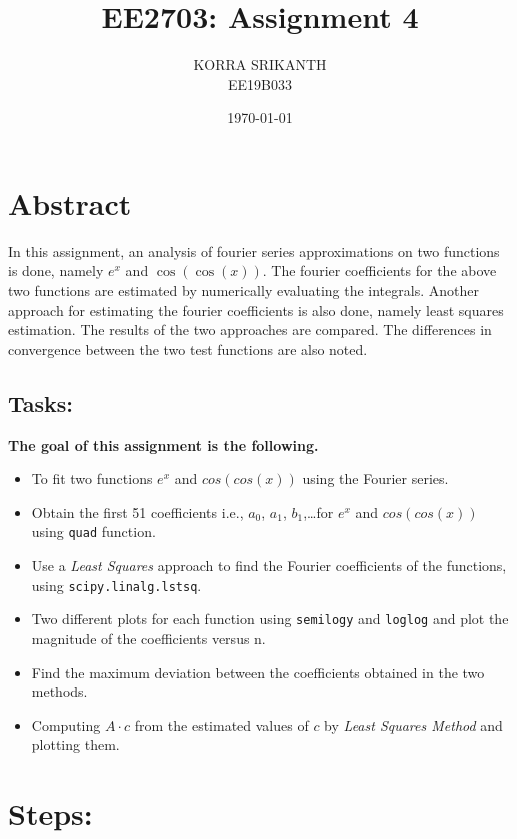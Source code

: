 \documentclass[11pt, a4paper, twoside]{article}
\title{EE2703: Assignment 4} %
\author{KORRA SRIKANTH\\{\samll EE19B033}} %
\date{\today} %
\begin{document}
	

\maketitle   %
		
\section*{Abstract}

In this assignment, an analysis of fourier series approximations on two
functions is done, namely \(e^x\) and \(\cos(\cos(x))\). 
\newline
The fourier coefficients for the above two functions are estimated by numerically evaluating the integrals.
\newline
Another approach for estimating the fourier coefficients is also done, namely least squares estimation. The results of the two approaches are compared.
\newline
The differences in convergence between the two test functions are also noted.



\subsection*{Tasks:}
\textbf{The goal of this assignment is the following.}
\begin{itemize}
\item To fit two functions $e^{x}$ and $cos(cos(x))$ using the Fourier series.
\item Obtain the first 51 coefficients i.e., $a_0$, $a_1$, $b_1$,\ldots for $e^x$ and $cos(cos(x))$ using \texttt{quad} function.
 \item Use a \textit{Least Squares} approach to find the Fourier coefficients of the functions, using \texttt{scipy.linalg.lstsq}.
  \item Two  different  plots  for  each  function  using  \texttt{semilogy}  and  \texttt{loglog} and plot the magnitude of the coefficients versus n.              \item Find the maximum deviation between the coefficients obtained in the two methods.
 \item Computing $A\cdot c$ from the estimated values of $c$ by \textit{Least Squares Method} and plotting them.
\end{itemize}


\section*{Steps:}
\end{document}
